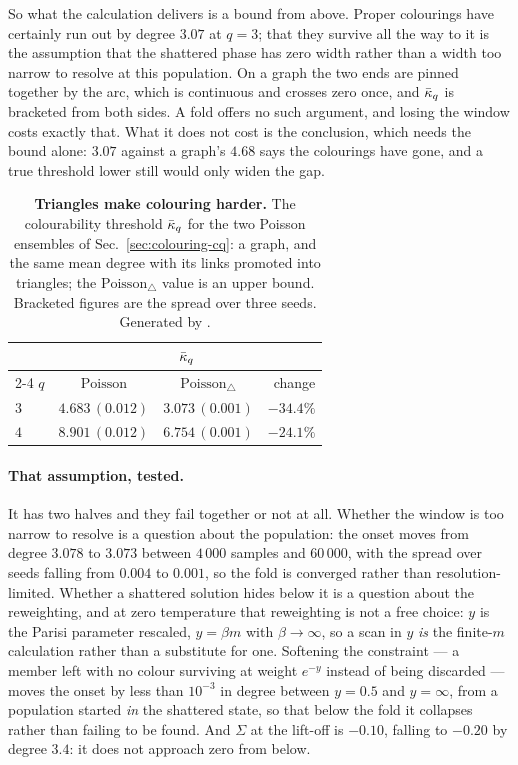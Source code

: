 So what the calculation delivers is a bound from above. Proper colourings have
certainly run out by degree $3.07$ at $q=3$; that they survive all the way to it
is the assumption that the shattered phase has zero width rather than a width
too narrow to resolve at this population. On a graph the two ends are pinned
together by the arc, which is continuous and crosses zero once, and $\bar\kappa_{q}$ is
bracketed from both sides. A fold offers no such argument, and losing the window
costs exactly that. What it does not cost is the conclusion, which needs the
bound alone: $3.07$ against a graph's $4.68$ says the colourings have gone, and
a true threshold lower still would only widen the gap.

\begin{table}[t]
\centering\small
\begin{tabular}{lccr}
\hline\hline
 & \multicolumn{3}{c}{$\bar\kappa_{q}$}\\
\cline{2-4}
$q$ & $\mathrm{Poisson}$ & $\mathrm{Poisson}_{\triangle}$ & change\\
\hline
$3$ & $4.683\,(0.012)$ & $3.073\,(0.001)$ & $-34.4\%$\\
$4$ & $8.901\,(0.012)$ & $6.754\,(0.001)$ & $-24.1\%$\\
\hline\hline
\end{tabular}
\caption{\textbf{Triangles make colouring harder.} The colourability
threshold $\bar\kappa_{q}$ for the two Poisson ensembles of
Sec.~\ref{sec:colouring-cq}: a graph, and the same mean degree with its links
promoted into triangles; the $\mathrm{Poisson}_{\triangle}$ value is an upper
bound. Bracketed figures are the spread over three seeds.
Generated by
.}
\label{tab:cq}
\end{table}

\paragraph{That assumption, tested.} It has two halves and they fail together
or not at all. Whether the window is too narrow to resolve is a question about
the population: the onset moves from degree $3.078$ to $3.073$ between $4\,000$
samples and $60\,000$, with the spread over seeds falling from $0.004$ to
$0.001$, so the fold is converged rather than resolution-limited. Whether a
shattered solution hides below it is a question about the reweighting, and at
zero temperature that reweighting is not a free choice: $y$ is the Parisi
parameter rescaled, $y=\beta m$ with $\beta\to\infty$, so a scan in $y$
\emph{is} the finite-$m$ calculation rather than a substitute for one.
Softening the constraint --- a member left with no colour surviving at weight
$e^{-y}$ instead of being discarded --- moves the onset by less than $10^{-3}$
in degree between $y=0.5$ and $y=\infty$, from a population started
\emph{in} the shattered state, so that below the fold it collapses rather than
failing to be found. And $\Sigma$ at the lift-off is $-0.10$, falling to
$-0.20$ by degree $3.4$: it does not approach zero from below.

